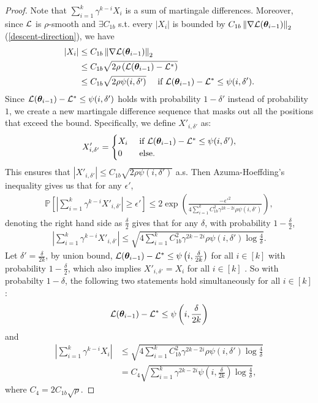 \begin{proof}
    Note that $\sum_{i=1}^{k}\gamma^{k-i} X_i$ is a sum of martingale differences. Moreover, since $\mathcal{L}$ is $\rho$-smooth and $\exists C_{1b}$ s.t. every $|X_i|$ is bounded by $C_{1b}\left\|\nabla \mathcal{L}({\bm{\theta}}_{i-1})\right\|_2$ (\cref{descent-direction}), we have 
    \begin{align*}
        \left|X_i\right| &\leq C_{1b}\left\|\nabla \mathcal{L}({\bm{\theta}}_{i-1})\right\|_2 \\
        &\leq C_{1b}\sqrt{2\rho\left(\mathcal{L}({\bm{\theta}}_{i-1})-\mathcal{L}^*\right)} \\
        &\leq C_{1b} \sqrt{2\rho \psi(i,\delta')} \quad \text{ if }\mathcal{L}({\bm{\theta}}_{i-1})-\mathcal{L}^* \leq \psi(i, \delta').
    \end{align*}
    Since $\mathcal{L}({\bm{\theta}}_{i-1})-\mathcal{L}^* \leq \psi(i, \delta')$ holds with probability $1-\delta'$ instead of probability $1$, we create a new martingale difference sequence that masks out all the positions that exceed the bound. Specifically, we define $X'_{i,\delta'}$ as:
    $$X'_{i,\delta'} = \begin{cases}
        X_{i} & \text{ if }\mathcal{L}({\bm{\theta}}_{i-1})-\mathcal{L}^* \leq \psi(i, \delta'), \\
        0 & \text{ else.}
    \end{cases}$$
    This ensures that $\left|X'_{i,\delta'} \right| \leq C_{1b} \sqrt{2\rho \psi(i,\delta')}$ a.s. Then Azuma-Hoeffding's inequality gives us that for any $\epsilon'$, 
    \begin{align*}
        \mathbb{P}\left[\left|\sum_{i=1}^{k}\gamma^{k-i}X'_{i,\delta'}\right| \geq \epsilon'\right] \leq 2\exp\left(\frac{-\epsilon'^2}{4\sum_{i=1}^{k}C_{1b}^2\gamma^{2k-2i}\rho \psi(i,\delta')}\right),
    \end{align*}
    denoting the right hand side as $\frac{\delta}{2}$ gives that for any $\delta$, with probability $1-\frac{\delta}{2}$, 
    \begin{align*}
        \left|\sum_{i=1}^{k}\gamma^{k-i}X'_{i,\delta'}\right| \leq \sqrt{4\sum_{i=1}^{k}C_{1b}^2\gamma^{2k-2i}\rho \psi(i,\delta')\log\frac{4}{\delta}}.
    \end{align*}
    Let $\delta' = \frac{\delta}{2k}$, by union bound, $\mathcal{L}({\bm{\theta}}_{i-1})-\mathcal{L}^* \leq \psi\left(i, \frac{\delta}{2k}\right)$ for all $i \in [k]$ with probability $1-\frac{\delta}{2}$, which also implies $X'_{i,\delta'} = X_i$ for all $i \in [k]$ . So with probabilty $1-\delta$, the following two statements hold simultaneously for all $i \in [k]$:
    $$\mathcal{L}({\bm{\theta}}_{i-1})-\mathcal{L}^* \leq \psi\left(i, \frac{\delta}{2k}\right)$$
    and
    \begin{align*}
        \left|\sum_{i=1}^{k}\gamma^{k-i}X_i\right| & \leq \sqrt{4\sum_{i=1}^{k}C_{1b}^2\gamma^{2k-2i}\rho \psi(i,\delta')\log\frac{4}{\delta}} \\
        &= C_4\sqrt{\sum_{i=1}^{k}\gamma^{2k-2i} \psi\left(i,\frac{\delta}{2k}\right)\log\frac{4}{\delta}},
    \end{align*}
    where $C_4 = 2C_{1b}\sqrt{\rho}$.
\end{proof}


